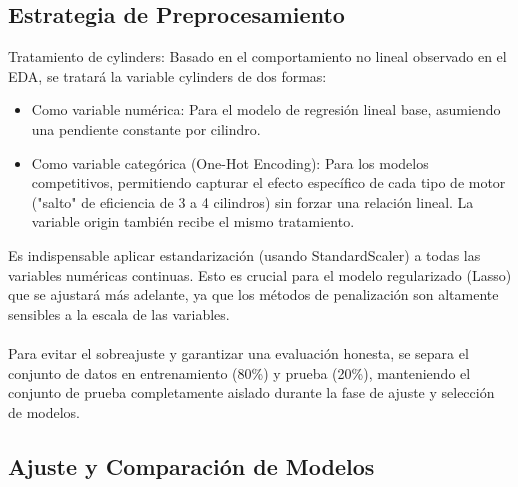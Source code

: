 \documentclass[11pt,spanish]{article}
\begin{document}
\subsection{Estrategia de Preprocesamiento}

Tratamiento de cylinders: Basado en el comportamiento no lineal observado en el EDA, se tratará la variable cylinders de dos formas:
\begin{itemize}
    \item Como variable numérica: Para el modelo de regresión lineal base, asumiendo una pendiente constante por cilindro.
\end{itemize}

\begin{itemize}
    \item Como variable categórica (One-Hot Encoding): Para los modelos competitivos, permitiendo capturar el efecto específico de cada tipo de motor ("salto" de eficiencia de 3 a 4 cilindros) sin forzar una relación lineal. La variable origin también recibe el mismo tratamiento.
\end{itemize}

Es indispensable aplicar estandarización (usando StandardScaler) a todas las variables numéricas continuas. Esto es crucial para el modelo regularizado (Lasso) que se ajustará más adelante, ya que los métodos de penalización son altamente sensibles a la escala de las variables.\\\\
Para evitar el sobreajuste y garantizar una evaluación honesta, se separa el conjunto de datos en entrenamiento (80\%) y prueba (20\%), manteniendo el conjunto de prueba completamente aislado durante la fase de ajuste y selección de modelos.

\subsection{Ajuste y Comparación de Modelos}
\end{document}
